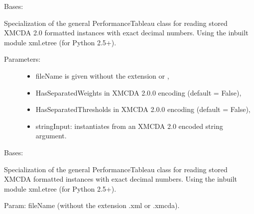 \documentclass[letterpaper,10pt,english]{sphinxmanual}
\begin{document}
\begin{fulllineitems}
\label{techDoc:perfTabs.XMCDA2PerformanceTableau}
Bases: {\hyperref[techDoc:perfTabs.PerformanceTableau]{\emph{}}}

Specialization of the general PerformanceTableau class for reading
stored XMCDA 2.0 formatted instances with exact decimal numbers.
Using the inbuilt module xml.etree (for Python 2.5+).
\begin{description}
\item[{Parameters:}] \leavevmode\begin{itemize}
\item {} 
fileName is given without the extension  or ,

\item {} 
HasSeparatedWeights in XMCDA 2.0.0 encoding (default = False),

\item {} 
HasSeparatedThresholds in XMCDA 2.0.0 encoding (default = False),

\item {} 
stringInput: instantiates from an XMCDA 2.0 encoded string argument.

\end{itemize}

\end{description}

\end{fulllineitems}


\begin{fulllineitems}
\label{techDoc:perfTabs.XMCDAPerformanceTableau}
Bases: {\hyperref[techDoc:perfTabs.PerformanceTableau]{\emph{}}}

Specialization of the general PerformanceTableau class for reading
stored XMCDA formatted instances with exact decimal numbers.
Using the inbuilt module
xml.etree (for Python 2.5+).

Param: fileName (without the extension .xml or .xmcda).

\end{fulllineitems}
\end{document}
